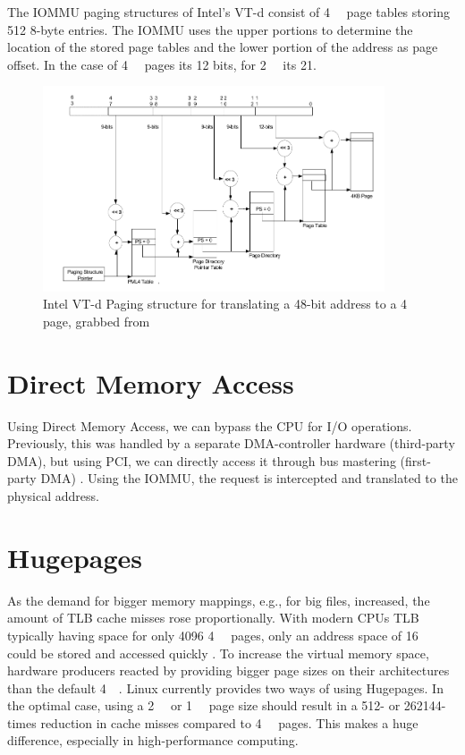 The IOMMU paging structures of Intel's VT-d consist of \qty{4}{\kibi\byte} page tables storing 512 8-byte entries. The IOMMU uses the upper portions to determine the location of the stored page tables and the lower portion of the address as page offset. In the case of \qty{4}{\kibi\byte} pages its 12 bits, for \qty{2}{\mebi\byte} its 21.

\begin{figure}[H]
    \centering
    \includegraphics[width=0.9\textwidth]{figures/4kibtranslation.pdf}
    \caption{Intel VT-d Paging structure for translating a 48-bit address to a \qty{4}{\kibi\byte} page, grabbed from \cite{vtdspec}}
    \label{fig:pagewalk}
\end{figure}

\section{Direct Memory Access}
Using Direct Memory Access, we can bypass the CPU for I/O operations. Previously, this was handled by a separate DMA-controller hardware (third-party DMA), but using PCI, we can directly access it through bus mastering (first-party DMA) \cite{maellmann}. Using the IOMMU, the request is intercepted and translated to the physical address.

\section{Hugepages}
As the demand for bigger memory mappings, e.g., for big files, increased, the amount of TLB cache misses rose proportionally. With modern CPUs TLB typically having space for only 4096 \qty{4}{\kibi\byte} pages, only an address space of \qty{16}{\mebi\byte} could be stored and accessed quickly \cite{emmerich2019user}. To increase the virtual memory space, hardware producers reacted by providing bigger page sizes on their architectures than the default \qty{4}{\kibi\byte}.
Linux currently provides two ways of using Hugepages.
In the optimal case, using a \qty{2}{\mebi\byte} or \qty{1}{\gibi\byte} page size should result in a 512- or 262144-times reduction in cache misses compared to \qty{4}{\kibi\byte} pages. This makes a huge difference, especially in high-performance computing.

